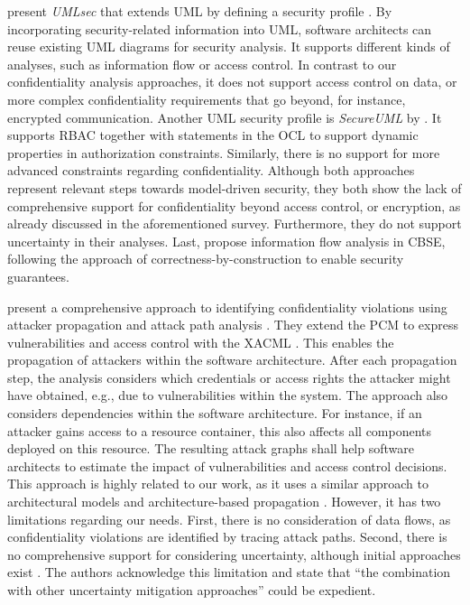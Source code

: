 \textcite{goos_umlsec_2002} present \emph{UMLsec} that extends \ac{UML} by defining a security profile \cite{juerjens_principles_2002,goos_towards_2001}. 
By incorporating security-related information into \ac{UML}, software architects can reuse existing \ac{UML} diagrams for security analysis.
It supports different kinds of analyses, such as information flow or access control. 
In contrast to our confidentiality analysis approaches, it does not support access control on data, or more complex confidentiality requirements that go beyond, for instance, encrypted communication.
Another \ac{UML} security profile is \emph{SecureUML} by \cite{lodderstedt_secureuml_2002}. 
It supports \acf{RBAC} together with statements in the \acf{OCL} to support dynamic properties in authorization constraints.
Similarly, there is no support for more advanced constraints regarding confidentiality.
Although both approaches represent relevant steps towards model-driven security, they both show the lack of comprehensive support for confidentiality beyond access control, or encryption, as already discussed in the aforementioned survey.
Furthermore, they do not support uncertainty in their analyses.
Last, \textcite{ronneberg_quantitative_2024} propose information flow analysis in \ac{CBSE}, following the approach of correctness-by-construction to enable security guarantees.

\textcite{walter_architectural_2022-1} present a comprehensive approach to identifying confidentiality violations using attacker propagation \cite{walter_architectural_2022-1,walter_architecture-based_2023} and attack path analysis \cite{walter_architecture-based_2023-1,walter_context-based_2023}.
They extend the \acf{PCM} \cite{reussner_modeling_2016} to express vulnerabilities and access control with the \acf{XACML} \cite{oasis_extensible_2013}.
This enables the propagation of attackers within the software architecture.
After each propagation step, the analysis considers which credentials or access rights the attacker might have obtained, e.g., due to vulnerabilities within the system.
The approach also considers dependencies within the software architecture.
For instance, if an attacker gains access to a resource container, this also affects all components deployed on this resource.
The resulting attack graphs shall help software architects to estimate the impact of vulnerabilities and access control decisions.
This approach is highly related to our work, as it uses a similar approach to architectural models \cite{reussner_modeling_2016} and architecture-based propagation \cite{hahner_architecture-based_2024,busch_architecture-based_2020}.
However, it has two limitations regarding our needs.
First, there is no consideration of data flows, as confidentiality violations are identified by tracing attack paths.
Second, there is no comprehensive support for considering uncertainty, although initial approaches exist \cite{walter_architecture-based_2023}.
The authors acknowledge this limitation and state that \enquote{the combination with other uncertainty mitigation approaches} \cite{walter_context-based_2023} could be expedient.


